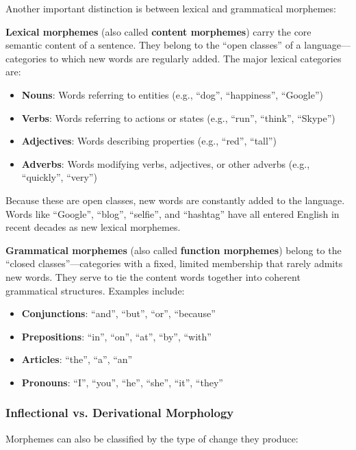 \documentclass[11pt,a4paper]{article}
\begin{document}
Another important distinction is between lexical and grammatical morphemes:

\textbf{Lexical morphemes} (also called \textbf{content morphemes}) carry the core semantic content of a sentence. They belong to the ``open classes'' of a language---categories to which new words are regularly added. The major lexical categories are:
\begin{itemize}
    \item \textbf{Nouns}: Words referring to entities (e.g., ``dog'', ``happiness'', ``Google'')
    \item \textbf{Verbs}: Words referring to actions or states (e.g., ``run'', ``think'', ``Skype'')
    \item \textbf{Adjectives}: Words describing properties (e.g., ``red'', ``tall'')
    \item \textbf{Adverbs}: Words modifying verbs, adjectives, or other adverbs (e.g., ``quickly'', ``very'')
\end{itemize}

Because these are open classes, new words are constantly added to the language. Words like ``Google'', ``blog'', ``selfie'', and ``hashtag'' have all entered English in recent decades as new lexical morphemes.

\textbf{Grammatical morphemes} (also called \textbf{function morphemes}) belong to the ``closed classes''---categories with a fixed, limited membership that rarely admits new words. They serve to tie the content words together into coherent grammatical structures. Examples include:
\begin{itemize}
    \item \textbf{Conjunctions}: ``and'', ``but'', ``or'', ``because''
    \item \textbf{Prepositions}: ``in'', ``on'', ``at'', ``by'', ``with''
    \item \textbf{Articles}: ``the'', ``a'', ``an''
    \item \textbf{Pronouns}: ``I'', ``you'', ``he'', ``she'', ``it'', ``they''
\end{itemize}

\subsubsection{Inflectional vs. Derivational Morphology}

Morphemes can also be classified by the type of change they produce:
\end{document}
